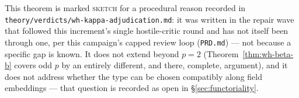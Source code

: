 \begin{scope}
This theorem is marked \textsc{sketch} for a procedural reason recorded in
\texttt{theory\slash{}verdicts\slash{}wh-kappa-adjudication.md}: it was written in the
repair wave that followed this increment's single hostile-critic round and
has not itself been through one, per this campaign's capped review loop
(\texttt{PRD.md}) — not because a specific gap is known. It does not extend
beyond $p=2$ (Theorem~\ref{thm:wh-beta-b} covers odd $p$ by an entirely
different, and there, complete, argument), and it does not address whether
the type can be chosen compatibly along field embeddings — that question is
recorded as open in \S\ref{sec:functoriality}.
\end{scope}



